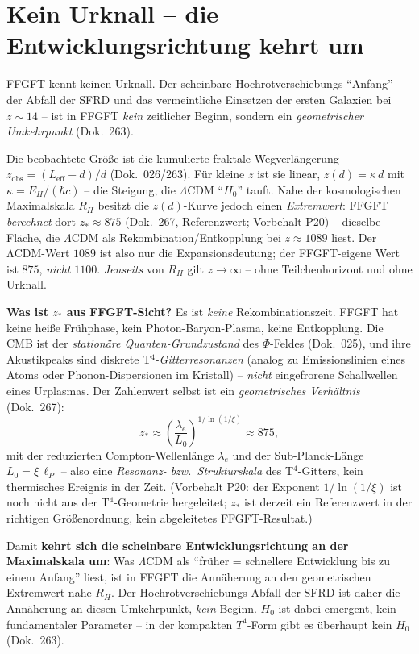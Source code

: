 \section{Kein Urknall -- die Entwicklungsrichtung kehrt um}

FFGFT kennt keinen Urknall. Der scheinbare Hochrotverschiebungs-\enquote{Anfang} --
der Abfall der SFRD und das vermeintliche Einsetzen der ersten Galaxien bei
$z\sim14$ -- ist in FFGFT \emph{kein} zeitlicher Beginn, sondern ein
\emph{geometrischer Umkehrpunkt} (Dok.~263).

Die beobachtete Größe ist die kumulierte fraktale Wegverlängerung
$z_{\text{obs}} = (L_{\text{eff}}-d)/d$ (Dok.~026/263). Für kleine $z$ ist sie
linear, $z(d) = \kappa\,d$ mit $\kappa = E_H/(\hbar c)$ -- die Steigung, die
$\Lambda$CDM \enquote{$H_0$} tauft. Nahe der kosmologischen Maximalskala $R_H$
besitzt die $z(d)$-Kurve jedoch einen \emph{Extremwert}: FFGFT \emph{berechnet} dort
$z_*\approx 875$ (Dok.~267, Referenzwert; Vorbehalt P20) -- dieselbe Fläche, die
$\Lambda$CDM als Rekombination/Entkopplung bei $z\approx 1089$ liest. Der
ΛCDM-Wert $1089$ ist also nur die Expansionsdeutung; der FFGFT-eigene Wert ist
$875$, \emph{nicht} $1100$. \emph{Jenseits} von $R_H$ gilt $z\to\infty$ -- ohne
Teilchenhorizont und ohne Urknall.

\textbf{Was ist $z_*$ aus FFGFT-Sicht?} Es ist \emph{keine} Rekombinationszeit. FFGFT
hat keine heiße Frühphase, kein Photon-Baryon-Plasma, keine Entkopplung. Die CMB ist
der \emph{stationäre Quanten-Grundzustand} des $\Phi$-Feldes (Dok.~025), und ihre
Akustikpeaks sind diskrete T$^4$-\emph{Gitterresonanzen} (analog zu Emissionslinien
eines Atoms oder Phonon-Dispersionen im Kristall) -- \emph{nicht} eingefrorene
Schallwellen eines Urplasmas. Der Zahlenwert selbst ist ein \emph{geometrisches
Verhältnis} (Dok.~267):
\[
  z_* \approx \left(\frac{\lambda_e}{L_0}\right)^{1/\ln(1/\xi)} \approx 875,
\]
mit der reduzierten Compton-Wellenlänge $\lambda_e$ und der Sub-Planck-Länge
$L_0=\xi\,\ell_P$ -- also eine \emph{Resonanz- bzw.\ Strukturskala} des T$^4$-Gitters,
kein thermisches Ereignis in der Zeit. (Vorbehalt P20: der Exponent $1/\ln(1/\xi)$ ist
noch nicht aus der T$^4$-Geometrie hergeleitet; $z_*$ ist derzeit ein Referenzwert in
der richtigen Größenordnung, kein abgeleitetes FFGFT-Resultat.)

Damit \textbf{kehrt sich die scheinbare Entwicklungsrichtung an der Maximalskala um}:
Was $\Lambda$CDM als \enquote{früher = schnellere Entwicklung bis zu einem Anfang}
liest, ist in FFGFT die Annäherung an den geometrischen Extremwert nahe $R_H$. Der
Hochrotverschiebungs-Abfall der SFRD ist daher die Annäherung an diesen Umkehrpunkt,
\emph{kein} Beginn. $H_0$ ist dabei emergent, kein fundamentaler Parameter -- in der
kompakten $T^4$-Form gibt es überhaupt kein $H_0$ (Dok.~263).

